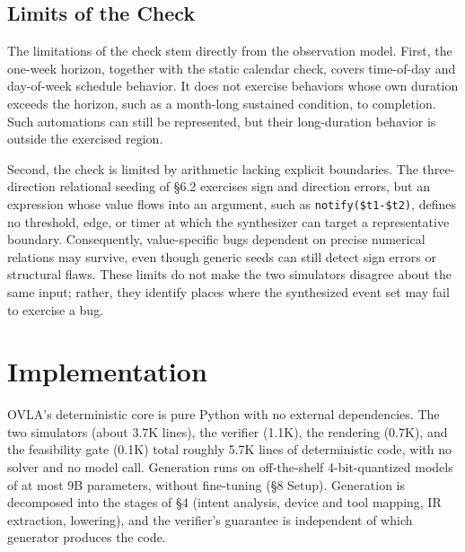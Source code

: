 \documentclass[sigconf,nonacm,anonymous,review]{acmart}
\begin{document}
\subsection{Limits of the Check}

The limitations of the check stem directly from the observation model. First, the one-week horizon, together with the static calendar check, covers time-of-day and day-of-week schedule behavior. It does not exercise behaviors whose own duration exceeds the horizon, such as a month-long sustained condition, to completion. Such automations can still be represented, but their long-duration behavior is outside the exercised region.

Second, the check is limited by arithmetic lacking explicit boundaries.
The three-direction relational seeding of \S6.2 exercises sign and direction errors, but an expression whose value flows into an argument, such as \texttt{notify(\$t1-\$t2)}, defines no threshold, edge, or timer at which the synthesizer can target a representative boundary. Consequently, value-specific bugs dependent on precise numerical relations may survive, even though generic seeds can still detect sign errors or structural flaws.
These limits do not make the two simulators disagree about the same input; rather, they identify places where the synthesized event set may fail to exercise a bug.

\section{Implementation}

OVLA's deterministic core is pure Python with no external dependencies. The two simulators (about 3.7K lines), the verifier (1.1K), the rendering (0.7K), and the feasibility gate (0.1K) total roughly 5.7K lines of deterministic code, with no solver and no model call. Generation runs on off-the-shelf 4-bit-quantized models of at most 9B parameters, without fine-tuning (\S8 Setup). Generation is decomposed into the stages of \S4 (intent analysis, device and tool mapping, IR extraction, lowering), and the verifier's guarantee is independent of which generator produces the code.
\end{document}
